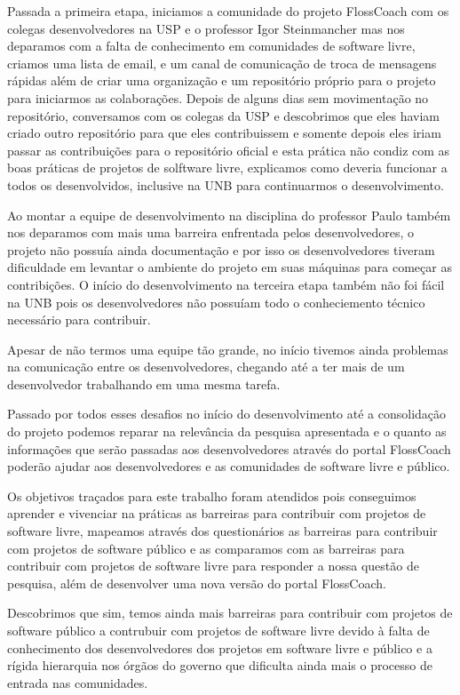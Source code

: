 Passada a primeira etapa, iniciamos a comunidade do projeto FlossCoach com os colegas
desenvolvedores na USP e o professor Igor Steinmancher mas nos deparamos com a 
falta de conhecimento em comunidades de software livre, criamos uma lista de email,
e um canal de comunicação de troca de mensagens rápidas além de criar uma organização
e um repositório próprio para o projeto para iniciarmos as colaborações.
Depois de alguns dias sem movimentação no repositório, conversamos com os colegas
da USP e descobrimos que eles haviam criado outro repositório para que eles contribuissem
e somente depois eles iriam passar as contribuições para o repositório oficial e esta
prática não condiz com as boas práticas de projetos de solftware livre, explicamos 
como deveria funcionar a todos os desenvolvidos, inclusive na UNB para continuarmos
o desenvolvimento.

Ao montar a equipe de desenvolvimento na disciplina do professor Paulo também nos deparamos
com mais uma barreira enfrentada pelos desenvolvedores, o projeto não possuía ainda 
documentação e por isso os desenvolvedores tiveram dificuldade em levantar o ambiente 
do projeto em suas máquinas para começar as contribições. O início do desenvolvimento
na terceira etapa também não foi fácil na UNB pois os desenvolvedores não possuíam
todo o conheciemento técnico necessário para contribuir.

Apesar de não termos uma equipe tão grande, no início tivemos ainda problemas na
comunicação entre os desenvolvedores, chegando até a ter mais de um desenvolvedor 
trabalhando em uma mesma tarefa.

Passado por todos esses desafios no início do desenvolvimento até a consolidação
do projeto podemos reparar na relevância da pesquisa apresentada e o quanto as
informações que serão passadas aos desenvolvedores através do portal FlossCoach poderão
ajudar aos desenvolvedores e as comunidades de software livre e público.

Os objetivos traçados para este trabalho foram atendidos pois conseguimos aprender
e vivenciar na práticas as barreiras para contribuir com projetos de software livre,
mapeamos através dos questionários as barreiras para contribuir com projetos de 
software público e as comparamos com as barreiras para contribuir com projetos
de software livre para responder a nossa questão de pesquisa, além de desenvolver 
uma nova versão do portal FlossCoach. 

Descobrimos que sim,
temos ainda mais barreiras para contribuir com projetos de software público a contrubuir
com projetos de software livre devido à falta de conhecimento dos desenvolvedores
dos projetos em software livre e público e a rígida hierarquia nos órgãos do governo
que dificulta ainda mais o processo de entrada nas comunidades.


